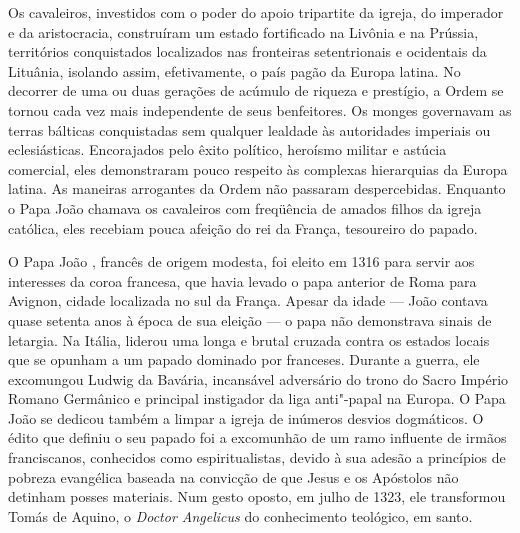 Os cavaleiros, investidos com o poder do apoio tripartite da igreja, do
imperador e da aristocracia, construíram um estado fortificado na
Livônia e na Prússia, territórios conquistados localizados nas
fronteiras setentrionais e ocidentais da Lituânia, isolando assim,
efetivamente, o país pagão da Europa latina. No decorrer de uma ou duas
gerações de acúmulo de riqueza e prestígio, a Ordem se tornou cada vez
mais independente de seus benfeitores. Os monges governavam as terras
bálticas conquistadas sem qualquer lealdade às autoridades imperiais ou
eclesiásticas. Encorajados pelo êxito político, heroísmo militar e
astúcia comercial, eles demonstraram pouco respeito às complexas
hierarquias da Europa latina. As maneiras arrogantes da Ordem não
passaram despercebidas. Enquanto o Papa João  chamava os cavaleiros
com freqüência de amados filhos da igreja católica, eles recebiam pouca
afeição do rei da França, tesoureiro do papado.

O Papa João , francês de origem modesta, foi eleito em 1316 para
servir aos interesses da coroa francesa, que havia levado o papa
anterior de Roma para Avignon, cidade localizada no sul da França.
Apesar da idade --- João  contava quase setenta anos à época de sua
eleição --- o papa não demonstrava sinais de letargia. Na Itália, liderou
uma longa e brutal cruzada contra os estados locais que se opunham a um
papado dominado por franceses. Durante a guerra, ele excomungou Ludwig
da Bavária, incansável adversário do trono do Sacro Império Romano
Germânico e principal instigador da liga anti"-papal na Europa. O Papa
João  se dedicou também a limpar a igreja de inúmeros desvios
dogmáticos. O édito que definiu o seu papado foi a excomunhão de um ramo
influente de irmãos franciscanos, conhecidos como espiritualistas,
devido à sua adesão a princípios de pobreza evangélica baseada na
convicção de que Jesus e os Apóstolos não detinham posses materiais. Num
gesto oposto, em julho de 1323, ele transformou Tomás de Aquino, o
\emph{Doctor Angelicus} do conhecimento teológico, em santo.

